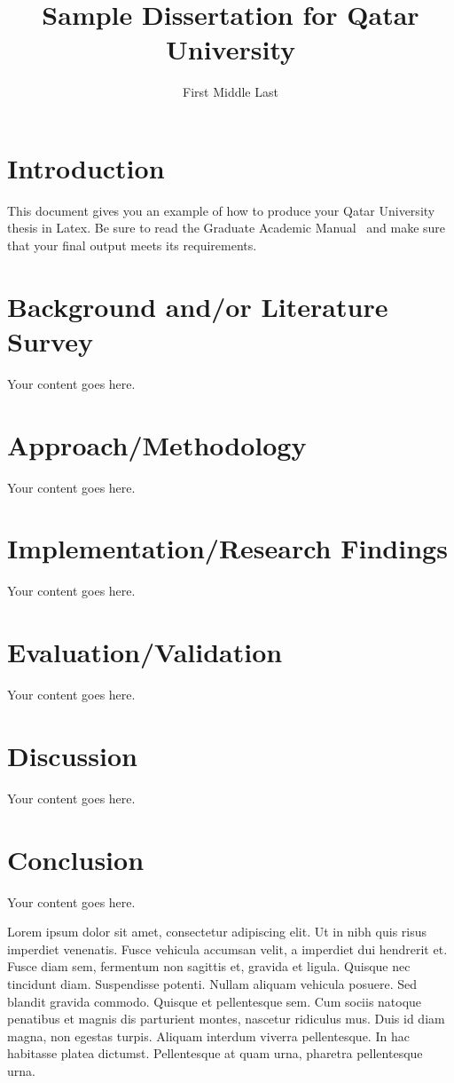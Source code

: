 \documentclass[12pt,lot,lof]{quthesis}
\title{Sample Dissertation for Qatar University}
\author{First Middle Last} %
\begin{document}
\makefrontmatter

\chapter{Introduction}
This document gives you an example of how to produce your Qatar 
University thesis in Latex.  Be sure to read the 
Graduate Academic Manual~\cite{qugam} and make sure that your
final output meets its requirements.

\chapter{Background and/or Literature Survey}
Your content goes here.

\chapter{Approach/Methodology}
Your content goes here.

\chapter{Implementation/Research Findings}
Your content goes here.

\chapter{Evaluation/Validation}
Your content goes here.

\chapter{Discussion}
Your content goes here.

\chapter{Conclusion}
Your content goes here.

Lorem ipsum dolor sit amet, consectetur adipiscing elit. Ut in nibh quis risus imperdiet venenatis. Fusce vehicula accumsan velit, a imperdiet dui hendrerit et. Fusce diam sem, fermentum non sagittis et, gravida et ligula. Quisque nec tincidunt diam. Suspendisse potenti. Nullam aliquam vehicula posuere. Sed blandit gravida commodo. Quisque et pellentesque sem. Cum sociis natoque penatibus et magnis dis parturient montes, nascetur ridiculus mus. Duis id diam magna, non egestas turpis. Aliquam interdum viverra pellentesque. In hac habitasse platea dictumst. Pellentesque at quam urna, pharetra pellentesque urna.
\end{document}
